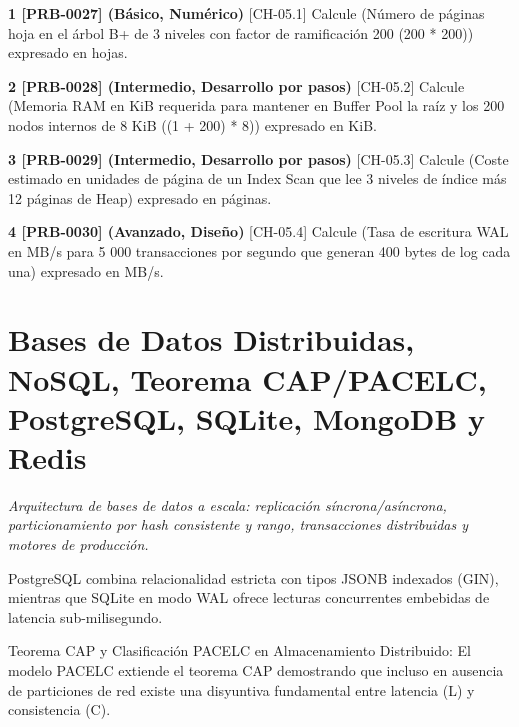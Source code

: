 \documentclass{book}
\begin{document}
\begin{tcolorbox}[title={Ejercicios}, studiumworked, breakable]

\noindent\textbf{1 [PRB-0027] (Básico, Numérico)}
[CH-05.1] Calcule (Número de páginas hoja en el árbol B+ de 3 niveles con factor de ramificación 200 (200 * 200)) expresado en hojas.

\noindent\textbf{2 [PRB-0028] (Intermedio, Desarrollo por pasos)}
[CH-05.2] Calcule (Memoria RAM en KiB requerida para mantener en Buffer Pool la raíz y los 200 nodos internos de 8 KiB ((1 + 200) * 8)) expresado en KiB.

\noindent\textbf{3 [PRB-0029] (Intermedio, Desarrollo por pasos)}
[CH-05.3] Calcule (Coste estimado en unidades de página de un Index Scan que lee 3 niveles de índice más 12 páginas de Heap) expresado en páginas.

\noindent\textbf{4 [PRB-0030] (Avanzado, Diseño)}
[CH-05.4] Calcule (Tasa de escritura WAL en MB/s para 5 000 transacciones por segundo que generan 400 bytes de log cada una) expresado en MB/s.
\end{tcolorbox}

\chapter{Bases de Datos Distribuidas, NoSQL, Teorema CAP/PACELC, PostgreSQL, SQLite, MongoDB y Redis}
\label{chap:ch-06}

\noindent\textit{Arquitectura de bases de datos a escala: replicación síncrona/asíncrona, particionamiento por hash consistente y rango, transacciones distribuidas y motores de producción.}

\begin{tcolorbox}[title={Consejo}, studiumtip, breakable]

PostgreSQL combina relacionalidad estricta con tipos JSONB indexados (GIN), mientras que SQLite en modo WAL ofrece lecturas concurrentes embebidas de latencia sub-milisegundo.
\end{tcolorbox}

\begin{tcolorbox}[title={Definición}, studiumdef, breakable]

Teorema CAP y Clasificación PACELC en Almacenamiento Distribuido: El modelo PACELC extiende el teorema CAP demostrando que incluso en ausencia de particiones de red existe una disyuntiva fundamental entre latencia (L) y consistencia (C).
\end{tcolorbox}
\end{document}
